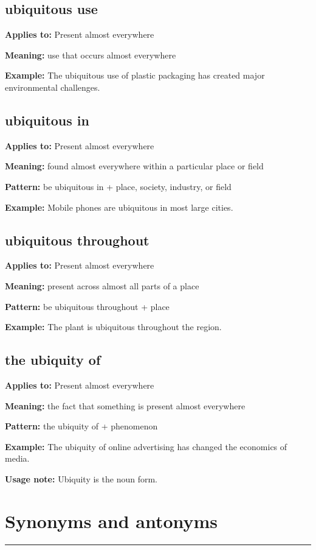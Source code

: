 \documentclass[11pt]{article}
\newcommand{\sectionrule}{\par\vspace{-0.5em}\noindent\textcolor{Accent}{\rule{\linewidth}{0.6pt}}\par}
\begin{document}
\subsection{ubiquitous use}
\textbf{Applies to:} Present almost everywhere

\textbf{Meaning:} use that occurs almost everywhere

\textbf{Example:} The ubiquitous use of plastic packaging has created major environmental challenges.

\subsection{ubiquitous in}
\textbf{Applies to:} Present almost everywhere

\textbf{Meaning:} found almost everywhere within a particular place or field

\textbf{Pattern:} be ubiquitous in + place, society, industry, or field

\textbf{Example:} Mobile phones are ubiquitous in most large cities.

\subsection{ubiquitous throughout}
\textbf{Applies to:} Present almost everywhere

\textbf{Meaning:} present across almost all parts of a place

\textbf{Pattern:} be ubiquitous throughout + place

\textbf{Example:} The plant is ubiquitous throughout the region.

\subsection{the ubiquity of}
\textbf{Applies to:} Present almost everywhere

\textbf{Meaning:} the fact that something is present almost everywhere

\textbf{Pattern:} the ubiquity of + phenomenon

\textbf{Example:} The ubiquity of online advertising has changed the economics of media.

\textbf{Usage note:} Ubiquity is the noun form.

\section{Synonyms and antonyms}
\sectionrule
\end{document}
